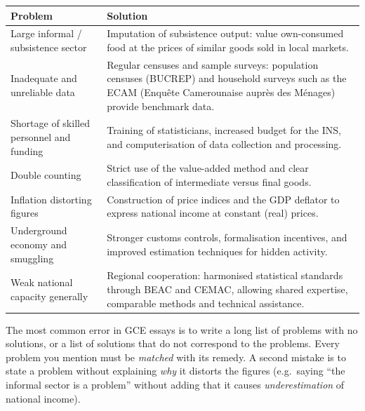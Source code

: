 \documentclass[11pt]{article}
\newcommand{\cle}[1]{{\popxbold\color{popdark}#1}}
\begin{document}
\begin{center}
\begin{tabularx}{\linewidth}{|X|X|}
\hline
\rowcolor{popblueL} \textbf{Problem} & \textbf{Solution} \\
\hline
Large informal / subsistence sector & \cle{Imputation} of subsistence output: value own-consumed food at the prices of similar goods sold in local markets. \\
\hline
Inadequate and unreliable data & Regular \cle{censuses and sample surveys}: population censuses (BUCREP) and household surveys such as the ECAM (Enqu\^ete Camerounaise aupr\`es des M\'enages) provide benchmark data. \\
\hline
Shortage of skilled personnel and funding & \cle{Training of statisticians}, increased budget for the INS, and \cle{computerisation} of data collection and processing. \\
\hline
Double counting & Strict use of the \cle{value-added} method and clear classification of intermediate versus final goods. \\
\hline
Inflation distorting figures & Construction of \cle{price indices} and the \cle{GDP deflator} to express national income at constant (real) prices. \\
\hline
Underground economy and smuggling & Stronger customs controls, formalisation incentives, and improved estimation techniques for hidden activity. \\
\hline
Weak national capacity generally & \cle{Regional cooperation}: harmonised statistical standards through BEAC and CEMAC, allowing shared expertise, comparable methods and technical assistance. \\
\hline
\end{tabularx}
\end{center}

\begin{attention}
The most common error in GCE essays is to write a long list of problems with no solutions, or a list of solutions that do not correspond to the problems. Every problem you mention must be \emph{matched} with its remedy. A second mistake is to state a problem without explaining \emph{why} it distorts the figures (e.g.\ saying ``the informal sector is a problem'' without adding that it causes \emph{underestimation} of national income).
\end{attention}
\end{document}
